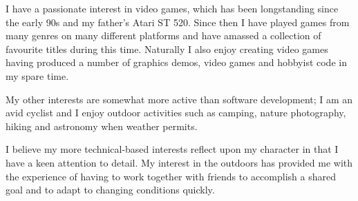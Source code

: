 
\begin{cvparagraph}

I have a passionate interest in video games, which has been longstanding since the early 90s and my father’s Atari
ST 520. Since then I have played games from many genres on many different platforms and have amassed a collection of
favourite titles during this time. Naturally I also enjoy creating video games having produced a number of graphics
demos, video games and hobbyist code in my spare time.

\end{cvparagraph}

\begin{cvparagraph}

My other interests are somewhat more active than software development; I am an avid cyclist and I enjoy outdoor
activities such as camping, nature photography, hiking and astronomy when weather permits.

\end{cvparagraph}

\begin{cvparagraph}

I believe my more technical-based interests reflect upon my character in that I have a keen attention to detail.
My interest in the outdoors has provided me with the experience of having to work together with friends to accomplish a
shared goal and to adapt to changing conditions quickly.

\end{cvparagraph}
